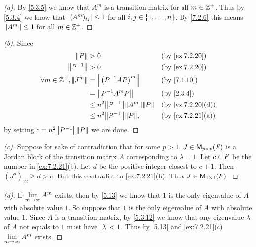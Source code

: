 \begin{proof}[(a)]
  By \cref{5.3.5} we know that \(A^m\) is a transition matrix for all \(m \in \mathbb{Z}^+\).
  Thus by \cref{5.3.4} we know that \(\left\lvert(A^m)_{i j}\right\rvert \leq 1\) for all \(i, j \in \left\lbrace1, \dots, n\right\rbrace\).
  By \cref{7.2.6} this means \(\left\lVert A^m\right\rVert \leq 1\) for all \(m \in \mathbb{Z}^+\).
\end{proof}

\begin{proof}[(b)]
  Since
  \begin{align*}
    \norm{P}                       & > 0                                        &  & \by{ex:7.2.20}    \\
    \norm{P^{-1}}                  & > 0                                        &  & \by{ex:7.2.20}    \\
    \forall m \in \Z^+, \norm{J^m} & = \norm{\pa{P^{-1} A P}^m}                 &  & \by{7.1.10}       \\
                                   & = \norm{P^{-1} A^m P}                      &  & \by{2.3.4}        \\
                                   & \leq n^2 \norm{P^{-1}} \norm{A^m} \norm{P} &  & \by{ex:7.2.20}[d] \\
                                   & \leq n^2 \norm{P^{-1}} \norm{P},           &  & \by{ex:7.2.21}[a]
  \end{align*}
  by setting \(c = n^2 \norm{P^{-1}} \norm{P}\) we are done.
\end{proof}

\begin{proof}[(c)]
  Suppose for sake of contradiction that for some \(p > 1\), \(J \in \ms[p][p][\F]\) is a Jordan block of the transition matrix \(A\) corresponding to \(\lambda = 1\).
  Let \(c \in \mathit{F}\) be the number in \cref{ex:7.2.21}(b).
  Let \(d\) be the positive integer closest to \(c + 1\).
  Then \((J^d)_{1 2} \geq d > c\).
  But this contradict to \cref{ex:7.2.21}(b).
  Thus \(J \in \ms[1][1][\F]\).
\end{proof}

\begin{proof}[(d)]
  If \(\lim\limits_{m \to \infty} A^m\) exists, then by \cref{5.13} we know that \(1\) is the only eigenvalue of \(A\) with absolute value \(1\).
  So suppose that \(1\) is the only eigenvalue of \(A\) with absolute value \(1\).
  Since \(A\) is a transition matrix, by \cref{5.3.12} we know that any eigenvalue \(\lambda\) of \(A\) not equals to \(1\) must have \(\left\lvert\lambda\right\rvert < 1\).
  Thus by \cref{5.13} and \cref{ex:7.2.21}(c) \(\lim\limits_{m \to \infty} A^m\) exists.
\end{proof}

